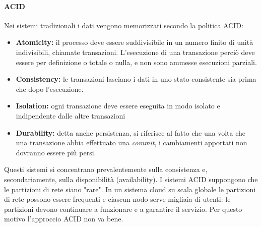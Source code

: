 \documentclass{article}
\begin{document}
\paragraph{ACID}
Nei sistemi tradizionali i dati vengono memorizzati secondo la politica ACID:
\begin{itemize}
    \item \textbf{Atomicity:} il processo deve essere suddivisibile in un numero finito di unità indivisibili, chiamate transazioni. L'esecuzione di una transazione perciò deve essere per definizione o totale o nulla, e non sono ammesse esecuzioni parziali.
    \item \textbf{Consistency:} le transazioni lasciano i dati in uno stato consistente sia prima che dopo l'esecuzione.
    \item \textbf{Isolation:}  ogni transazione deve essere eseguita in modo isolato e indipendente dalle altre transazioni
    \item \textbf{Durability:} detta anche persistenza, si riferisce al fatto che una volta che una transazione abbia effettuato una \textit{commit}, i cambiamenti apportati non dovranno essere più persi.
\end{itemize}
Questi sistemi si concentrano prevalentemente sulla consistenza e, secondariamente, sulla disponibilità (availability). I sistemi ACID suppongono che le partizioni di rete siano "rare". In un sistema cloud su scala globale le partizioni di rete possono essere frequenti e ciascun nodo serve migliaia di utenti: le partizioni devono continuare a funzionare e a garantire il servizio. Per questo motivo l'approccio ACID non va bene.
\end{document}
